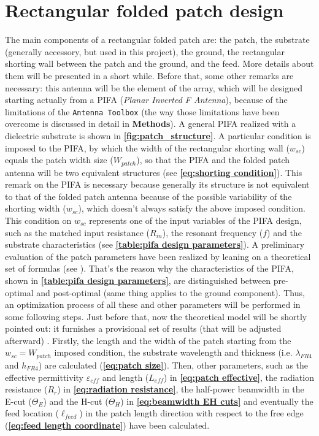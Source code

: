 \documentclass[10 pt,a4paper,twocolumn]{article}
\begin{document}
{		%




\section*{Rectangular folded patch design}

The main components of a rectangular folded patch are: the patch, the substrate (generally accessory, but used in this project), the ground, the rectangular shorting wall between the patch and the ground, and the feed. More details about them will be presented in a short while. Before that, some other remarks are necessary: this antenna will be the element of the array, which will be designed starting actually from a PIFA (\emph{Planar Inverted F Antenna}), because of the limitations of the \texttt{\color{Mahogany}Antenna Toolbox} (the way those limitations have been overcome is discussed in detail in \textbf{\color{BurntOrange} Methods}). A general PIFA realized with a dielectric substrate is shown in \textbf{\cref{fig:patch_structure}}. A particular condition is imposed to the PIFA, by which the width of the rectangular shorting wall ($w_{sc}$) equals the patch width size ($W_{patch}$), so that the PIFA and the folded patch antenna will be two equivalent structures (see \textbf{\cref{eq:shorting condition}}). This remark on the PIFA is necessary because generally its structure is not equivalent to that of the folded patch antenna because of the possible variability of the shorting width ($w_{sc}$), which doesn't always satisfy the above imposed condition. This condition on $w_{sc}$ represents one of the input variables of the PIFA design, such as the matched input resistance ($R_{in}$), the resonant frequency ($f$) and the substrate characteristics (see \textbf{\cref{table:pifa design parameters}}). A preliminary evaluation of the patch parameters have been realized by leaning on a theoretical set of formulas (see \textbf{\cite{Balanis1}}). That's the reason why the characteristics of the PIFA, shown in \textbf{\cref{table:pifa design parameters}}, are distinguished between pre-optimal and post-optimal (same thing applies to the ground component). Thus, an optimization process of all these and other parameters will be performed in some following steps. Just before that, now the theoretical model will be shortly pointed out: it furnishes a provisional set of results (that will be adjusted afterward) . Firstly, the length and the width of the patch starting from the $w_{sc}=W_{patch}$ imposed condition, the substrate wavelength and thickness (i.e. $\lambda_{FR4}$ and $h_{FR4}$) are calculated (\textbf{\cref{eq:patch size}}). Then, other parameters, such as the effective permittivity $\varepsilon_{eff}$  and length ($L_{eff}$) in \textbf{\cref{eq:patch effective}}, the radiation resistance ($R_r$) in \textbf{\cref{eq:radiation resistance}}, the half-power beamwidth in the E-cut ($\Theta_E$) and the H-cut ($\Theta_H$) in \textbf{\cref{eq:beamwidth EH cuts}} and eventually the feed location ($\ell_{feed}$) in the patch length direction with respect to the free edge (\textbf{\cref{eq:feed length coordinate}}) have been calculated. 
}
\end{document}
